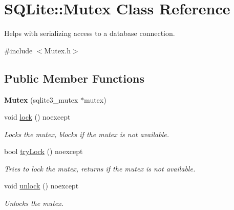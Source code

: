 \hypertarget{class_s_q_lite_1_1_mutex}{\section{S\-Q\-Lite\-:\-:Mutex Class Reference}
\label{class_s_q_lite_1_1_mutex}
}


Helps with serializing access to a database connection.  




{\ttfamily \#include $<$Mutex.\-h$>$}

\subsection*{Public Member Functions}
\begin{DoxyCompactItemize}
\item 
\hypertarget{class_s_q_lite_1_1_mutex_ad98ed6e326082828a5860cc037683bd1}{{\bfseries Mutex} (sqlite3\-\_\-mutex $\ast$mutex)}\label{class_s_q_lite_1_1_mutex_ad98ed6e326082828a5860cc037683bd1}

\item 
\hypertarget{class_s_q_lite_1_1_mutex_a56ba1f0c1411940ab52279497d15812a}{void \hyperlink{class_s_q_lite_1_1_mutex_a56ba1f0c1411940ab52279497d15812a}{lock} () noexcept}\label{class_s_q_lite_1_1_mutex_a56ba1f0c1411940ab52279497d15812a}

\begin{DoxyCompactList}\small\item\em Locks the mutex, blocks if the mutex is not available. \end{DoxyCompactList}\item 
bool \hyperlink{class_s_q_lite_1_1_mutex_a95b5ebd5fef0bd37b30e3867d60389f8}{try\-Lock} () noexcept
\begin{DoxyCompactList}\small\item\em Tries to lock the mutex, returns if the mutex is not available. \end{DoxyCompactList}\item 
\hypertarget{class_s_q_lite_1_1_mutex_ad9238aeb94205ac18d67c9652dcc6ef9}{void \hyperlink{class_s_q_lite_1_1_mutex_ad9238aeb94205ac18d67c9652dcc6ef9}{unlock} () noexcept}\label{class_s_q_lite_1_1_mutex_ad9238aeb94205ac18d67c9652dcc6ef9}

\begin{DoxyCompactList}\small\item\em Unlocks the mutex. \end{DoxyCompactList}\end{DoxyCompactItemize}


